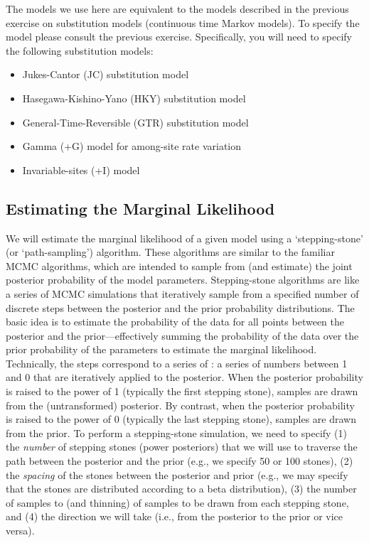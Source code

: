The models we use here are equivalent to the models described in the previous exercise on substitution models (continuous time Markov models).
To specify the model please consult the previous exercise. Specifically, you will need to specify the following substitution models:
\begin{itemize}
\item Jukes-Cantor (JC) substitution model \citep[][]{Jukes1969}
\item Hasegawa-Kishino-Yano (HKY) substitution model \citep[][]{Hasegawa1985}
\item General-Time-Reversible (GTR) substitution model \citep[][]{Tavare1986}
\item Gamma (+G) model for among-site rate variation \citep[][]{yang94a}
\item Invariable-sites (+I) model \citep[][]{Hasegawa1985}
\end{itemize}


\bigskip
\subsection{Estimating the Marginal Likelihood}

We will estimate the marginal likelihood of a given model using a `stepping-stone' (or `path-sampling') algorithm.
These algorithms are similar to the familiar MCMC algorithms, which are intended to sample from (and estimate) the joint posterior probability of the model parameters.
Stepping-stone algorithms are like a series of MCMC simulations that iteratively sample from a specified number of discrete steps between the posterior and the prior probability distributions.
The basic idea is to estimate the probability of the data for all points between the posterior and the prior---effectively summing the probability of the data over the prior probability of the parameters to estimate the marginal likelihood. 
Technically, the steps correspond to a series of : a series of numbers between 1 and 0 that are iteratively applied to the posterior.
When the posterior probability is raised to the power of 1 (typically the first stepping stone), samples are drawn from the (untransformed) posterior.
By contrast, when the posterior probability is raised to the power of 0 (typically the last stepping stone), samples are drawn from the prior.
To perform a stepping-stone simulation, we need to specify (1) the \emph{number} of stepping stones (power posteriors) that we will use to traverse the path between the posterior and the prior (e.g., we specify 50 or 100 stones), (2) the \emph{spacing} of the stones between the posterior and prior (e.g., we may specify that the stones are distributed according to a beta distribution), (3) the number of samples to (and thinning) of samples to be drawn from each stepping stone, and (4) the direction we will take (i.e., from the posterior to the prior or vice versa).



